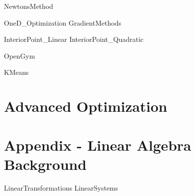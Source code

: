 \documentclass[letter,12pt]{book}
\renewcommand{\0}{\mathbf{0}}
\begin{document}
{NewtonsMethod}



{OneD_Optimization}
{GradientMethods}

{InteriorPoint_Linear}
{InteriorPoint_Quadratic}

{OpenGym}


{KMeans}

\part{Advanced Optimization}



%

%
%

\appendix
\part{Appendix - Linear Algebra Background}
{LinearTransformations} %
{LinearSystems}



\end{document}
